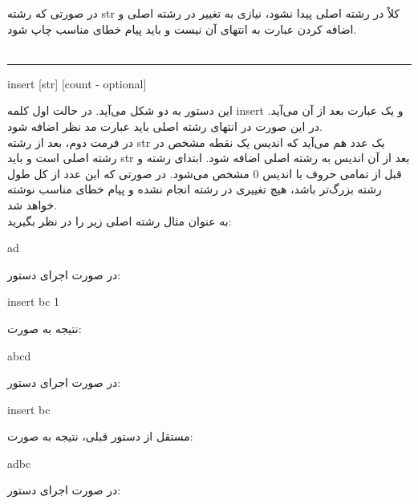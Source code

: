\documentclass[]{article}
\begin{document}
در صورتی که رشته str کلاً در رشته اصلی پیدا نشود، نیازی به تغییر در رشته اصلی و اضافه کردن عبارت به انتهای آن نیست و باید پیام خطای مناسب چاپ شود.\\\\
\noindent\rule[0.5ex]{\linewidth}{1pt}
\begin{tcolorbox}[boxrule=0pt]
	\begin{latin}
  	  \large{
  	  	insert [str] [count - optional]
		}
	\end{latin}
\end{tcolorbox}
این دستور به دو شکل می‌آید. در حالت اول کلمه insert و یک عبارت بعد از آن می‌آید. در این صورت در انتهای رشته اصلی باید عبارت مد نظر اضافه شود.\\
در فرمت دوم، بعد از رشته str یک عدد هم می‌آید که اندیس یک نقطه مشخص در رشته اصلی است و باید str بعد از آن اندیس به رشته اصلی اضافه شود. ابتدای رشته و قبل از تمامی حروف با اندیس 0 مشخص می‌شود. در صورتی که این عدد از کل طول رشته بزرگ‌تر باشد، هیچ تغییری در رشته انجام نشده و پیام خطای مناسب نوشته خواهد شد.\\
به عنوان مثال رشته اصلی زیر را در نظر بگیرید:\\
\begin{tcolorbox}[boxrule=0pt]
	\begin{latin}
  	  \large{
		ad
		}
	\end{latin}
\end{tcolorbox}
در صورت اجرای دستور:
\begin{tcolorbox}[boxrule=0pt]
	\begin{latin}
  	  \large{
  	  	insert bc 1
		}
	\end{latin}
\end{tcolorbox}
نتیجه به صورت:
\begin{tcolorbox}[boxrule=0pt]
	\begin{latin}
  	  \large{
  	  	abcd
		}
	\end{latin}
\end{tcolorbox}
در صورت اجرای دستور:
\begin{tcolorbox}[boxrule=0pt]
	\begin{latin}
  	  \large{
  	  	insert bc
		}
	\end{latin}
\end{tcolorbox}
مستقل از دستور قبلی، نتیجه به صورت:
\begin{tcolorbox}[boxrule=0pt]
	\begin{latin}
  	  \large{
  	  	adbc
		}
	\end{latin}
\end{tcolorbox}
در صورت اجرای دستور:
\end{document}
